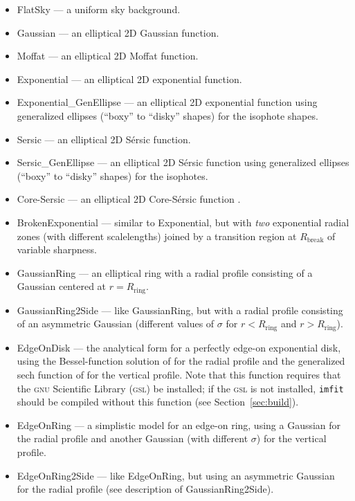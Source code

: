 \documentclass[10pt,a4paper,article]{memoir}
\newcommand{\imfit}{\texttt{imfit}}
\begin{document}
\begin{itemize}
\item FlatSky --- a uniform sky background.
\item Gaussian --- an elliptical 2D Gaussian function.
\item Moffat --- an elliptical 2D Moffat function.
\item Exponential --- an elliptical 2D exponential function.
\item Exponential\_GenEllipse --- an elliptical 2D exponential function using
generalized ellipses (``boxy'' to ``disky'' shapes) for the isophote shapes.
\item Sersic --- an elliptical 2D S\'ersic function.
\item Sersic\_GenEllipse --- an elliptical 2D S\'ersic function using
generalized ellipses (``boxy'' to ``disky'' shapes) for the isophotes.
\item Core-Sersic --- an elliptical 2D Core-S\'ersic function \citep{graham03,trujillo04}.
\item BrokenExponential --- similar to Exponential, but with \textit{two}
exponential radial zones (with different scalelengths) joined by a transition region
at $R_{\mathrm{break}}$ of variable sharpness.
\item GaussianRing --- an elliptical ring with a radial profile
consisting of a Gaussian centered at $r = R_{\mathrm{ring}}$.
\item GaussianRing2Side --- like GaussianRing, but with a radial profile
consisting of an asymmetric Gaussian (different values of $\sigma$ for
$r < R_{\mathrm{ring}}$ and $r > R_{\mathrm{ring}}$).
\item EdgeOnDisk --- the analytical form for a perfectly edge-on exponential
disk, using the Bessel-function solution of \citet{vdk81} for 
the radial profile and the generalized sech function of \citet{vdk88} 
for the vertical profile. Note that this function requires that the \textsc{gnu}
Scientific Library (\textsc{gsl}) be installed; if the \textsc{gsl} is not installed, \imfit{}
should be compiled without this function (see Section~\ref{sec:build}).
\item EdgeOnRing --- a simplistic model for an edge-on ring, using a
Gaussian for the radial profile and another Gaussian (with
different $\sigma$) for the vertical profile.
\item EdgeOnRing2Side --- like EdgeOnRing, but using an
asymmetric Gaussian for the radial profile (see description of GaussianRing2Side).

\end{itemize}
\end{document}
